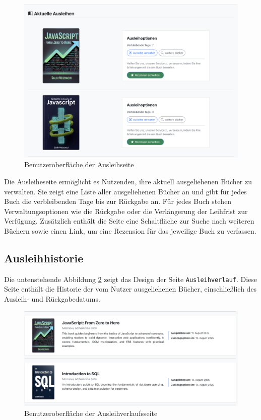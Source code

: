 \begin{figure}[H]
	\centering
	\includegraphics[width=1.0\textwidth]{images/UI-screenshots/Loans-Page.png}
	\caption{Benutzeroberfläche der Ausleihseite}
	\label{fig:Loans-Page}
\end{figure}

\noindent Die Ausleiheseite ermöglicht es Nutzenden, ihre aktuell ausgeliehenen Bücher zu verwalten. Sie zeigt eine Liste aller ausgeliehenen Bücher an und gibt für jedes Buch die verbleibenden Tage bis zur Rückgabe an. Für jedes Buch stehen Verwaltungsoptionen wie die Rückgabe oder die Verlängerung der Leihfrist zur Verfügung. Zusätzlich enthält die Seite eine Schaltfläche zur Suche nach weiteren Büchern sowie einen Link, um eine Rezension für das jeweilige Buch zu verfassen.

\subsection{Ausleihhistorie}
Die untenstehende Abbildung \ref{fig:Loans-History-Page} zeigt das Design der Seite \texttt{Ausleihverlauf}. Diese Seite enthält die Historie der vom Nutzer ausgeliehenen Bücher, einschließlich des Ausleih- und Rückgabedatums.

\begin{figure}[H]
	\centering
	\includegraphics[width=1.0\textwidth]{images/UI-screenshots/Loans-History.png}
	\caption{Benutzeroberfläche der Ausleihverlaufsseite}%
	\label{fig:Loans-History-Page}
\end{figure}

